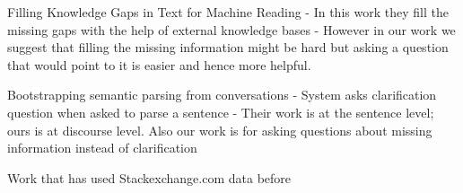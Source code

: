 \documentclass[11pt]{article}
\begin{document}
Filling Knowledge Gaps in Text for Machine Reading
- In this work they fill the missing gaps with the help of external knowledge bases
- However in our work we suggest that filling the missing information might be hard but asking a question that would point to it is easier and hence more helpful.

Bootstrapping semantic parsing from conversations
- System asks clarification question when asked to parse a sentence 
- Their work is at the sentence level; ours is at discourse level. Also our work is for asking questions about missing information instead of clarification

Work that has used Stackexchange.com data before

\fi


\end{document}
